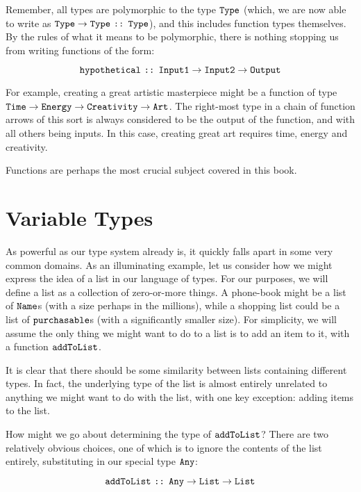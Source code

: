 \documentclass[12pt]{book}
\newcommand{\type}[1]{\ensuremath{\text{\texttt{#1}}}}
\newcommand{\func}[1]{\ensuremath{\text{\texttt{#1}}}}
\newcommand{\typeof}{\ensuremath{\text{ \texttt{::} }}}
\begin{document}
Remember, all types are polymorphic to the type \type{Type} (which, we are now able to write as $\type{Type} \to
\type{Type} \typeof \type{Type}$), and this includes function types themselves. By the rules of what it means to be
polymorphic, there is nothing stopping us from writing functions of the form:

$$ \func{hypothetical} \typeof \type{Input1} \to \type{Input2} \to \type{Output}$$

For example, creating a great artistic masterpiece might be a function of type $\type{Time} \to \type{Energy} \to
\type{Creativity} \to \type{Art}$. The right-most type in a chain of function arrows of this sort is always considered
to be the output of the function, and with all others being inputs. In this case, creating great art requires time,
energy and creativity.

Functions are perhaps the most crucial subject covered in this
book.


\section{Variable Types}
As powerful as our type system already is, it quickly falls apart in some very common domains. As an illuminating
example, let us consider how we might express the idea of a list in our language of types. For our purposes, we will
define a list as a collection of zero-or-more things. A phone-book might be a list of \type{Name}s (with a size perhaps
in the millions), while a shopping list could be a list of \type{purchasable}s (with a significantly smaller size). For
simplicity, we will assume the only thing we might want to do to a list is to add an item to it, with a function
$\func{addToList}$.

It is clear that there should be some similarity between lists containing different types. In fact, the underlying type
of the list is almost entirely unrelated to anything we might want to do with the list, with one key exception: adding
items to the list.

How might we go about determining the type of \func{addToList}? There are two relatively obvious choices, one of which
is to ignore the contents of the list entirely, substituting in our special type \type{Any}:

$$ \func{addToList} \typeof \type{Any} \to \type{List} \to \type{List} $$
\end{document}
